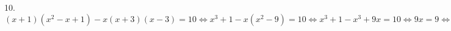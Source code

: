 10. $(x+1)(x^2-x+1)-x(x+3)(x-3)=10\Leftrightarrow x^3+1-x(x^2-9)=10\Leftrightarrow x^3+1-x^3+9x=10\Leftrightarrow9x=9\Leftrightarrow x=1.$\\
